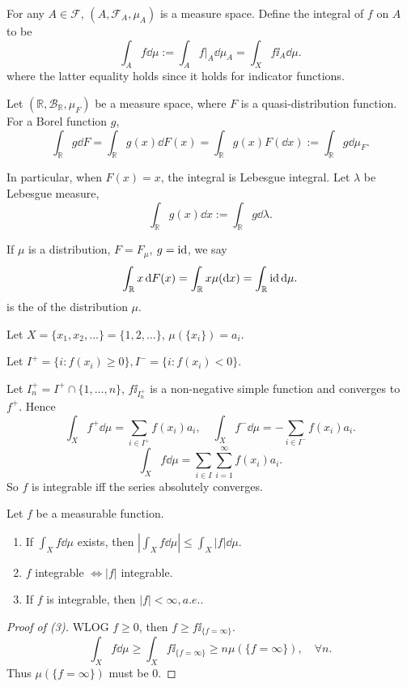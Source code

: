 For any $A\in \mathscr{F}$, $(A, \mathscr{F}_A, \mu_A)$ is a measure space.
Define  the integral of $f$ on $A$ to be
\[
\int_A f\dd \mu := \int_A f\big|_A \dd \mu_A = \int_X f\ii_A \dd \mu.
\]
where the latter equality holds since it holds for indicator functions.

\begin{example}
	Let $(\mathbb{R}, \mathscr{B}_{\mathbb{R}}, \mu_F)$ be a measure space,
	where $F$ is a quasi-distribution function.
	For a Borel function $g$,
	\[
	\int_{\mathbb{R}} g\dd F = \int_{\mathbb{R}} g(x)\dd F(x)
	= \int_{\mathbb{R}} g(x)F(\dd x) := \int_{\mathbb{R}}g\dd \mu_F.
	\]

	In particular, when $F(x) = x$, the integral is Lebesgue integral.
	Let $\lambda$ be Lebesgue measure,
	\[
	\int_{\mathbb{R}}g(x)\dd x := \int_{\mathbb{R}}g\dd \lambda.
	\]

	If $\mu$ is a distribution, $F = F_\mu$,  $g =\operatorname{id}$,
	we say
	\[
	\int_{\mathbb{R}} x\mathop{}\!\mathrm{d} F(x) = \int_{\mathbb{R}} x \mu(\mathop{}\!\mathrm{d} x)
	= \int_{\mathbb{R}} \operatorname{id} \mathop{}\!\mathrm{d} \mu.
	\]
	is the  of the distribution $\mu$.
\end{example}

\begin{example}
	Let $X = \{x_1,x_2,\dots\} = \{1,2,\dots\}$, $\mu(\{x_i\}) = a_i$.

	Let $I^+ = \{i: f(x_i) \ge 0\}, I^- = \{i: f(x_i) < 0\}$.

	Let $I^+_n = I^+ \cap \{1,\dots,n\}$, $f\ii_{I^+_n}$ is a non-negative simple
	function and converges to $f^+$.
	Hence
	\[
	\int_X f^+ \dd \mu = \sum_{i\in I^+} f(x_i) a_i,\quad
	\int_X f^- \dd \mu = - \sum_{i\in I^-} f(x_i)a_i.
	\]
	\[
	\int_X f\dd \mu = \sum_{i\in I} \sum_{i=1}^{\infty} f(x_i)a_i.
	\]
	So $f$ is integrable iff the series absolutely converges.
\end{example}

\begin{theorem}
	Let $f$ be a measurable function.
	\begin{enumerate}[(1)]
		\item If $\int_X f\dd \mu$ exists,
			then $|\int_X f\dd \mu|\le \int_X|f|\dd \mu$.
		\item $f$ integrable $\iff |f|$ integrable.
		\item If $f$ is integrable, then $|f|<\infty, a.e.$.
    \end{enumerate}
\end{theorem}
\begin{proof}[Proof of (3)]
	WLOG $f\ge 0$, then $f\ge f\ii_{\{f=\infty\}}$.
	\[
	\int_X f\dd \mu \ge \int _X f\ii_{\{f=\infty\}}\ge n\mu(\{f=\infty\}),
	\quad \forall n.
	\]
	Thus $\mu(\{f=\infty\})$ must be $0$.
\end{proof}

